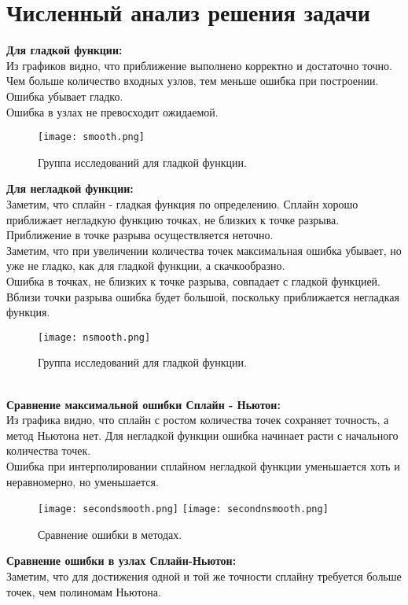 \documentclass[12pt]{article}
\begin{document}
\section{Численный анализ решения задачи}
\textbf{Для гладкой функции:}\\
Из графиков видно, что приближение выполнено корректно и достаточно точно.\\
Чем больше количество входных узлов, тем меньше ошибка при построении. Ошибка убывает гладко.\\
Ошибка в узлах не превосходит ожидаемой.\\

\begin{figure}[h!]
\center
\texttt{[image: smooth.png]}
\caption{Группа исследований для гладкой функции.}
\end{figure}
\newpage
\newpage
\textbf{Для негладкой функции:}\\
Заметим, что сплайн - гладкая функция по определению. Сплайн хорошо приближает негладкую функцию  точках, не близких к точке разрыва. Приближение в точке разрыва осуществляется неточно.\\
Заметим, что при увеличении количества точек максимальная ошибка убывает, но уже не гладко, как для гладкой функции, а скачкообразно.\\
Ошибка в точках, не близких к точке разрыва, совпадает с гладкой функцией. Вблизи точки разрыва ошибка будет большой, поскольку приближается негладкая функция.
\begin{figure}[h!]
\center
\texttt{[image: nsmooth.png]}
\caption{Группа исследований для гладкой функции.}
\end{figure}\\
\newpage
\textbf{Сравнение максимальной ошибки Сплайн - Ньютон:}\\
Из графика видно, что сплайн с ростом количества точек сохраняет точность, а метод Ньютона нет. Для негладкой функции ошибка начинает расти с начального количества точек.\\
Ошибка при интерполировании сплайном негладкой функции уменьшается хоть и неравномерно, но уменьшается.
\begin{figure}[h!]
\center
\texttt{[image: secondsmooth.png]}
\texttt{[image: secondnsmooth.png]}
\caption{Сравнение ошибки в методах.}
\end{figure}
\newpage
\textbf{Сравнение ошибки в узлах Сплайн-Ньютон:}\\
Заметим, что для достижения одной и той же точности сплайну требуется больше точек, чем полиномам Ньютона.
\end{document}
